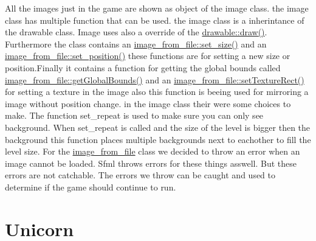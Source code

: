 All the images just in the game are shown as object of the image class. the image class has multiple function that can be used. the image class is a inherintance of the drawable class. Image uses also a override of the \hyperlink{classdrawable_a4e49e2c1121704c83ce24c5f48dd910f}{drawable\+::draw()}. Furthermore the class contains an \hyperlink{classimage__from__file_a43b0d6b11bf46827308e4e6cb7aa8579}{image\+\_\+from\+\_\+file\+::set\+\_\+size()} and an \hyperlink{classimage__from__file_a868911f8d541af91290fb8dc56435cd2}{image\+\_\+from\+\_\+file\+::set\+\_\+position()} these functions are for setting a new size or position.\+Finally it contains a function for getting the global bounds called \hyperlink{classimage__from__file_a971a591f906fa5c6e85b4e32cfc3d6a0}{image\+\_\+from\+\_\+file\+::get\+Global\+Bounds()} and an \hyperlink{classimage__from__file_a6561a7e8833e4ca84ba5a31e98802757}{image\+\_\+from\+\_\+file\+::set\+Texture\+Rect()} for setting a texture in the image also this function is beeing used for mirroring a image without position change. in the image class their were some choices to make. The function set\+\_\+repeat is used to make sure you can only see background. When set\+\_\+repeat is called and the size of the level is bigger then the background this function places multiple backgrounds next to eachother to fill the level size. For the \hyperlink{classimage__from__file}{image\+\_\+from\+\_\+file} class we decided to throw an error when an image cannot be loaded. Sfml throws errors for these things asswell. But these errors are not catchable. The errors we throw can be caught and used to determine if the game should continue to run.\hypertarget{index_unicorn}{}\section{Unicorn}\label{index_unicorn}
